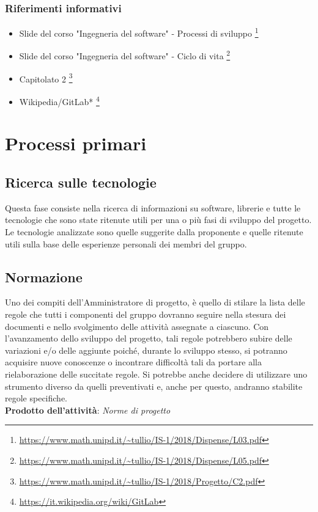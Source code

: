 \documentclass[11pt,a4paper]{article}
\begin{document}
	\subsubsection{Riferimenti informativi}
	\begin{itemize}
		\item Slide del corso "Ingegneria del software" - Processi di sviluppo 
		\footnote{\url{https://www.math.unipd.it/~tullio/IS-1/2018/Dispense/L03.pdf}}
		\item Slide del corso "Ingegneria del software" - Ciclo di vita 
		\footnote{\url{https://www.math.unipd.it/~tullio/IS-1/2018/Dispense/L05.pdf}}
		\item Capitolato 2
		\footnote{\url{https://www.math.unipd.it/~tullio/IS-1/2018/Progetto/C2.pdf}}
		\item Wikipedia/GitLab* 
		\footnote{\url {https://it.wikipedia.org/wiki/GitLab}}
	\end{itemize}					
	\newpage
	
	\section{Processi primari}
	\subsection{Ricerca sulle tecnologie} 
	Questa fase consiste nella ricerca di informazioni su software, librerie e tutte le tecnologie che sono state ritenute utili per una o più fasi di sviluppo del progetto. Le tecnologie analizzate  sono quelle suggerite dalla proponente e quelle ritenute utili sulla base delle esperienze personali dei membri del gruppo. 
	
	
	\subsection{Normazione}
	Uno dei compiti dell'Amministratore di progetto, è quello di stilare la lista delle regole che tutti i componenti del gruppo dovranno seguire nella stesura dei documenti e nello svolgimento delle attività assegnate a ciascuno. Con l'avanzamento dello sviluppo del progetto, tali regole potrebbero subire delle variazioni e/o delle aggiunte poiché, durante lo sviluppo stesso, si potranno acquisire nuove conoscenze o incontrare difficoltà tali da portare alla rielaborazione delle succitate regole. Si potrebbe anche decidere di utilizzare uno strumento diverso da quelli preventivati e, anche per questo, andranno stabilite regole specifiche.\\
	\textbf{Prodotto dell'attività}: \textit{Norme di progetto}
	
\end{document}
